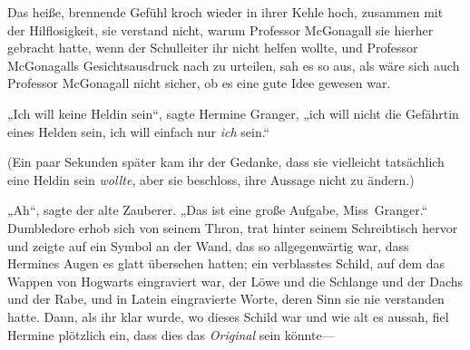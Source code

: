 Das heiße, brennende Gefühl kroch wieder in ihrer Kehle hoch, zusammen mit der Hilflosigkeit, sie verstand nicht, warum Professor McGonagall sie hierher gebracht hatte, wenn der Schulleiter ihr nicht helfen wollte, und Professor McGonagalls Gesichtsausdruck nach zu urteilen, sah es so aus, als wäre sich auch Professor McGonagall nicht sicher, ob es eine gute Idee gewesen war.

„Ich will keine Heldin sein“, sagte Hermine Granger, „ich will nicht die Gefährtin eines Helden sein, ich will einfach nur \emph{ich} sein.“

(Ein paar Sekunden später kam ihr der Gedanke, dass sie vielleicht tatsächlich eine Heldin sein \emph{wollte}, aber sie beschloss, ihre Aussage nicht zu ändern.)

„Ah“, sagte der alte Zauberer. „Das ist eine große Aufgabe, Miss~Granger.“ Dumbledore erhob sich von seinem Thron, trat hinter seinem Schreibtisch hervor und zeigte auf ein Symbol an der Wand, das so allgegenwärtig war, dass Hermines Augen es glatt übersehen hatten; ein verblasstes Schild, auf dem das Wappen von Hogwarts eingraviert war, der Löwe und die Schlange und der Dachs und der Rabe, und in Latein eingravierte Worte, deren Sinn sie nie verstanden hatte. Dann, als ihr klar wurde, wo dieses Schild war und wie alt es aussah, fiel Hermine plötzlich ein, dass dies das \emph{Original} sein könnte—

